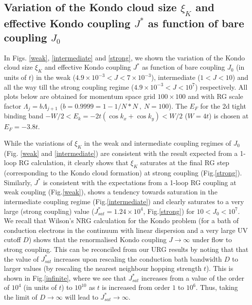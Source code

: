 \documentclass[aps,prl,preprint,groupedaddress]{revtex4-2}
\begin{document}
\subsection{Variation of the Kondo cloud size $\xi_{K}$ and effective Kondo coupling $J^{*}$ as function of bare coupling $J_{0}$}
In Figs. \ref{weak}, \ref{intermediate} and \ref{strong}, we shown the variation of the Kondo cloud size $\xi_{K}$ and effective Kondo coupling $J^{*}$ as function of bare coupling $J_{0}$ (in units of $t$) in the weak ($4.9\times 10^{-3}<J<7\times 10^{-3}$), intermediate ($1<J<10$) and all the way till the strong coupling regime ($4.9\times 10^{-3}<J<10^{7}$) respectively.
All plots below are obtained for momentum space grid $100\times 100$ and with RG scale factor $\Lambda_{j}=b\Lambda_{j+1}$ ($b=0.9999 = 1-1/N*N~,~N=100$). The $E_{F}$ for the 2d tight binding band $-W/2<E_{k}=-2t(\cos k_{x}+\cos k_{y})<W/2$ ($W=4t$) is chosen at $E_{F}=-3.8t$. 
\par\noindent
While the variations of $\xi_{K}$ in the weak and intermediate coupling regimes of $J_{0}$ (Fig. \ref{weak} and \ref{intermediate}) are consistent with the result expected from a 1-loop RG calculation, it clearly shows that $\xi_{K}$ saturates at the final RG step (corresponding to the Kondo cloud formation) at strong coupling (Fig.\ref{strong}). Similarly, $J^{*}$ is consistent with the expectations from a 1-loop RG coupling at weak coupling (Fig.\ref{weak}), shows a tendency towards saturation in the intermediate coupling regime (Fig.\ref{intermediate}) and clearly saturates to a very large (strong coupling) value ($J^{*}_{sat}=1.24\times 10^{4}$, Fig.\ref{strong}) for $10< J_{0}< 10^{7}$. We recall that Wilson's NRG calculation for the Kondo problem (for a bath of conduction electrons in the continuum with linear dispersion and a very large UV cutoff $D$) shows that the renormalised Kondo coupling $J\to\infty$ under flow to strong coupling. This can be reconciled from our URG results by noting that that the value of $J^{*}_{sat}$ increases upon rescaling the conduction bath bandwidth $D$ to larger values (by rescaling the nearest neighbour hopping strength $t$). This is shown in Fig.\ref{infinite}, where we see that $J^{*}_{sat}$ increases from a value of the order of $10^{4}$ (in units of $t$) to $10^{10}$ as $t$ is increased from order $1$ to $10^{6}$. Thus, taking the limit of $D\to\infty$ will lead to $J^{*}_{sat}\to\infty$. 
\end{document}
